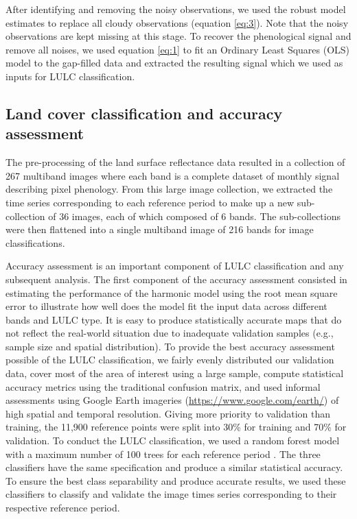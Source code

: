 \documentclass[12pt,oneside,preprint,3p,authoryear,times]{elsarticle} %
\begin{document}
After identifying and removing the noisy observations, we used the
robust model estimates to replace all cloudy observations (equation
\eqref{eq:3}). Note that the noisy observations are kept missing at this
stage. To recover the phenological signal and remove all noises, we used
equation \eqref{eq:1} to fit an Ordinary Least Squares (OLS) model to
the gap-filled data and extracted the resulting signal which we used as
inputs for LULC classification.

\hypertarget{land-cover-classification-and-accuracy-assessment}{%
\subsection{Land cover classification and accuracy
assessment}\label{land-cover-classification-and-accuracy-assessment}}

The pre-processing of the land surface reflectance data resulted in a
collection of 267 multiband images where each band is a complete dataset
of monthly signal describing pixel phenology. From this large image
collection, we extracted the time series corresponding to each reference
period to make up a new sub-collection of 36 images, each of which
composed of 6 bands. The sub-collections were then flattened into a
single multiband image of 216 bands for image classifications.

Accuracy assessment is an important component of LULC classification and
any subsequent analysis. The first component of the accuracy assessment
consisted in estimating the performance of the harmonic model using the
root mean square error to illustrate how well does the model fit the
input data across different bands and LULC type. It is easy to produce
statistically accurate maps that do not reflect the real-world situation
due to inadequate validation samples (e.g., sample size and spatial
distribution). To provide the best accuracy assessment possible of the
LULC classification, we fairly evenly distributed our validation data,
cover most of the area of interest using a large sample, compute
statistical accuracy metrics using the traditional confusion matrix, and
used informal assessments using Google Earth imageries
(\url{https://www.google.com/earth/}) of high spatial and temporal
resolution. Giving more priority to validation than training, the 11,900
reference points were split into 30\% for training and 70\% for
validation. To conduct the LULC classification, we used a random forest
model with a maximum number of 100 trees for each reference period
\citep{Breiman-2001, Oshiro-2012}. The three classifiers have the same
specification and produce a similar statistical accuracy. To ensure the
best class separability and produce accurate results, we used these
classifiers to classify and validate the image times series
corresponding to their respective reference period.
\end{document}
